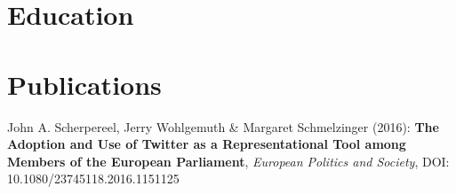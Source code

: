 \documentclass[10pt,a4paper,roman]{moderncv}        %
\begin{document}

\section{Education}

\section{Publications}
\small John A. Scherpereel, Jerry Wohlgemuth \& Margaret Schmelzinger (2016): \textbf{The Adoption and Use of Twitter as a Representational
Tool among Members of the European Parliament}, \textit{European Politics and Society}, DOI: 10.1080/23745118.2016.1151125

\clearpage





\end{document}

